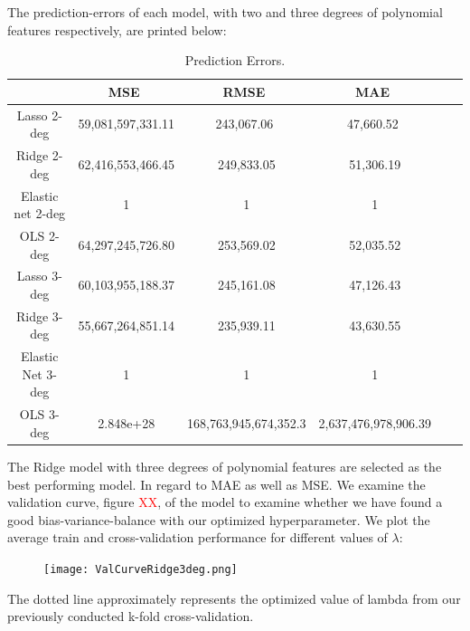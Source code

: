 \documentclass[12pt,a4paper]{article}
\begin{document}
The prediction-errors of each model, with two and three degrees of polynomial features respectively, are printed below:
\begin{table}[H]
\begin{center}
\caption{Prediction Errors. \label{time}}
\begin{tabular}{| c | c | c | c | c | c |} 
\hline
   & \ MSE \ & \, RMSE \ & \ MAE \ \\ \hline
   Lasso 2-deg & 59,081,597,331.11 & \ 243,067.06 \  & \ 47,660.52 \ \\ 
  Ridge 2-deg & 62,416,553,466.45 & 249,833.05 & 51,306.19  \\ 
  Elastic net 2-deg & 1 & 1 & 1  \\ 
  OLS 2-deg & 64,297,245,726.80 & 253,569.02 & 52,035.52  \\ \hline 
  Lasso 3-deg & 60,103,955,188.37 & 245,161.08 & 47,126.43  \\ 
  Ridge 3-deg & 55,667,264,851.14 & 235,939.11 & 43,630.55  \\ 
  Elastic Net 3-deg & 1 & 1 & 1  \\
  OLS 3-deg & 2.848e+28 & 168,763,945,674,352.3 & 2,637,476,978,906.39  \\ \hline
\end{tabular}
\end{center}
\end{table}
The Ridge model with three degrees of polynomial features are selected as the best performing model. In regard to MAE as well as MSE.\newline
We examine the validation curve, figure \textcolor{red}{XX}, of the model to examine whether we have found a good bias-variance-balance with our optimized hyperparameter. We plot the average train and cross-validation performance for different values of $\lambda$: 

\begin{figure}[H]
\centering
\caption{}
\texttt{[image: ValCurveRidge3deg.png]}
\end{figure}
The dotted line approximately represents the optimized value of lambda from our previously conducted k-fold cross-validation. 
\end{document}
